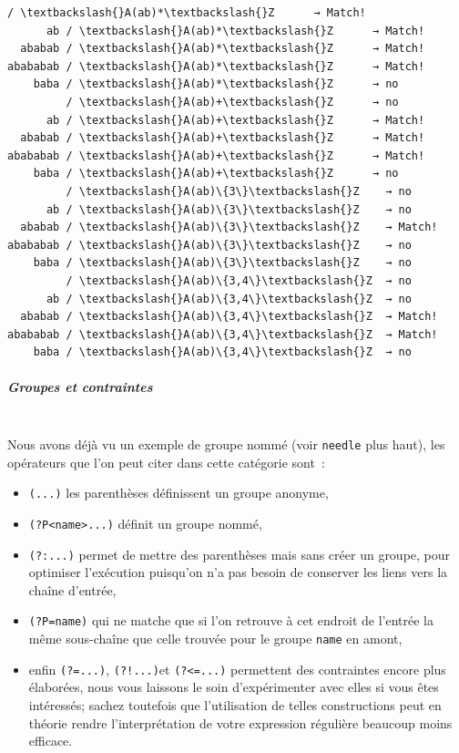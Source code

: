     \begin{Verbatim}[commandchars=\\\{\}]
         / \textbackslash{}A(ab)*\textbackslash{}Z      → Match!
      ab / \textbackslash{}A(ab)*\textbackslash{}Z      → Match!
  ababab / \textbackslash{}A(ab)*\textbackslash{}Z      → Match!
abababab / \textbackslash{}A(ab)*\textbackslash{}Z      → Match!
    baba / \textbackslash{}A(ab)*\textbackslash{}Z      → no
         / \textbackslash{}A(ab)+\textbackslash{}Z      → no
      ab / \textbackslash{}A(ab)+\textbackslash{}Z      → Match!
  ababab / \textbackslash{}A(ab)+\textbackslash{}Z      → Match!
abababab / \textbackslash{}A(ab)+\textbackslash{}Z      → Match!
    baba / \textbackslash{}A(ab)+\textbackslash{}Z      → no
         / \textbackslash{}A(ab)\{3\}\textbackslash{}Z    → no
      ab / \textbackslash{}A(ab)\{3\}\textbackslash{}Z    → no
  ababab / \textbackslash{}A(ab)\{3\}\textbackslash{}Z    → Match!
abababab / \textbackslash{}A(ab)\{3\}\textbackslash{}Z    → no
    baba / \textbackslash{}A(ab)\{3\}\textbackslash{}Z    → no
         / \textbackslash{}A(ab)\{3,4\}\textbackslash{}Z  → no
      ab / \textbackslash{}A(ab)\{3,4\}\textbackslash{}Z  → no
  ababab / \textbackslash{}A(ab)\{3,4\}\textbackslash{}Z  → Match!
abababab / \textbackslash{}A(ab)\{3,4\}\textbackslash{}Z  → Match!
    baba / \textbackslash{}A(ab)\{3,4\}\textbackslash{}Z  → no

    \end{Verbatim}

    \hypertarget{groupes-et-contraintes}{%
\subparagraph{Groupes et contraintes\\\\}\label{groupes-et-contraintes}}

    Nous avons déjà vu un exemple de groupe nommé (voir \texttt{needle} plus
haut), les opérateurs que l'on peut citer dans cette catégorie sont~:

\begin{itemize}
	\item 
	\texttt{(...)} les parenthèses définissent un groupe anonyme,
	\item
	\texttt{(?P\textless{}name\textgreater{}...)} définit un groupe nommé,
	\item
	\texttt{(?:...)} permet de mettre des parenthèses mais sans créer un
	groupe, pour optimiser l'exécution puisqu'on n'a pas besoin de conserver
	les liens vers la chaîne d'entrée,
	\item
	\texttt{(?P=name)} qui ne matche
	que si l'on retrouve à cet endroit de l'entrée la même sous-chaîne que
	celle trouvée pour le groupe \texttt{name} en amont,
	\item
	enfin
	\texttt{(?=...)}, \texttt{(?!...)}et \texttt{(?\textless{}=...)}
	permettent des contraintes encore plus élaborées, nous vous laissons le
	soin d'expérimenter avec elles si vous êtes intéressés; sachez toutefois
	que l'utilisation de telles constructions peut en théorie rendre
	l'interprétation de votre expression régulière beaucoup moins efficace.
\end{itemize}

